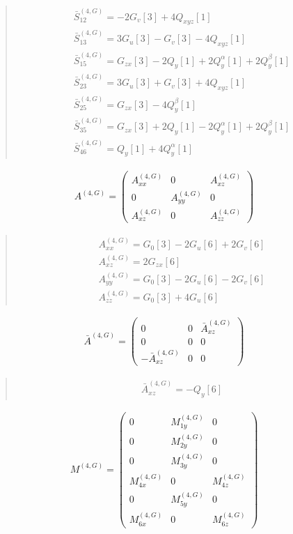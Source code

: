 \documentclass[fleqn,10pt]{jsarticle}
\begin{document}
\begin{quote}
\begin{align*}
& \bar{S}^{(4,G)}_{12} = - 2 G_{v}[3] + 4 Q_{xyz}[1] \\
& \bar{S}^{(4,G)}_{13} = 3 G_{u}[3] - G_{v}[3] - 4 Q_{xyz}[1] \\
& \bar{S}^{(4,G)}_{15} = G_{zx}[3] - 2 Q_{y}[1] + 2 Q_{y}^{\alpha}[1] + 2 Q_{y}^{\beta}[1] \\
& \bar{S}^{(4,G)}_{23} = 3 G_{u}[3] + G_{v}[3] + 4 Q_{xyz}[1] \\
& \bar{S}^{(4,G)}_{25} = G_{zx}[3] - 4 Q_{y}^{\beta}[1] \\
& \bar{S}^{(4,G)}_{35} = G_{zx}[3] + 2 Q_{y}[1] - 2 Q_{y}^{\alpha}[1] + 2 Q_{y}^{\beta}[1] \\
& \bar{S}^{(4,G)}_{46} = Q_{y}[1] + 4 Q_{y}^{\alpha}[1]
\end{align*}
\end{quote}
\begin{align*}
A^{(4,G)} = \begin{pmatrix} A^{(4,G)}_{xx} & 0 & A^{(4,G)}_{xz} \\ 0 & A^{(4,G)}_{yy} & 0 \\ A^{(4,G)}_{xz} & 0 & A^{(4,G)}_{zz} \end{pmatrix}
\end{align*}
\begin{quote}
\begin{align*}
& A^{(4,G)}_{xx} = G_{0}[3] - 2 G_{u}[6] + 2 G_{v}[6] \\
& A^{(4,G)}_{xz} = 2 G_{zx}[6] \\
& A^{(4,G)}_{yy} = G_{0}[3] - 2 G_{u}[6] - 2 G_{v}[6] \\
& A^{(4,G)}_{zz} = G_{0}[3] + 4 G_{u}[6]
\end{align*}
\end{quote}
\begin{align*}
\bar{A}^{(4,G)} = \begin{pmatrix} 0 & 0 & \bar{A}^{(4,G)}_{xz} \\ 0 & 0 & 0 \\ - \bar{A}^{(4,G)}_{xz} & 0 & 0 \end{pmatrix}
\end{align*}
\begin{quote}
\begin{align*}
& \bar{A}^{(4,G)}_{xz} = - Q_{y}[6]
\end{align*}
\end{quote}
\begin{align*}
M^{(4,G)} = \begin{pmatrix} 0 & M^{(4,G)}_{1y} & 0 \\ 0 & M^{(4,G)}_{2y} & 0 \\ 0 & M^{(4,G)}_{3y} & 0 \\ M^{(4,G)}_{4x} & 0 & M^{(4,G)}_{4z} \\ 0 & M^{(4,G)}_{5y} & 0 \\ M^{(4,G)}_{6x} & 0 & M^{(4,G)}_{6z} \end{pmatrix}
\end{align*}
\end{document}

